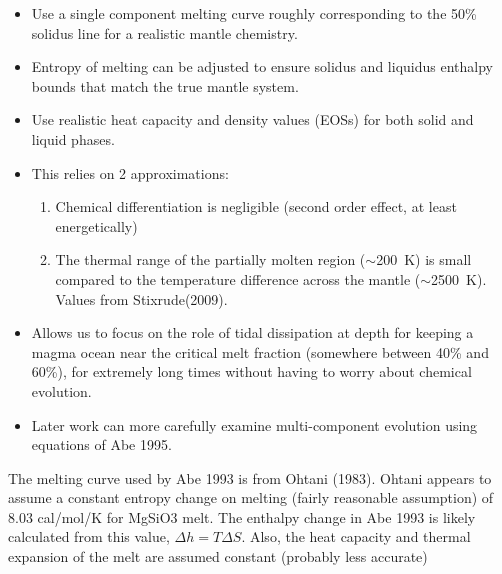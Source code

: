 \begin{itemize}
  \item Use a single component melting curve roughly corresponding to the 50\% solidus line for a realistic mantle chemistry. 
  \item Entropy of melting can be adjusted to ensure solidus and liquidus enthalpy bounds that match the true mantle system. 
  \item Use realistic heat capacity and density values (EOSs) for both solid and liquid phases. 
  \item This relies on 2 approximations: 
    \begin{enumerate}
      \item Chemical differentiation is negligible (second order effect, at least energetically)
      \item The thermal range of the partially molten region ($\sim$200~K) is small compared to the temperature difference across the mantle ($\sim$2500~K). Values from Stixrude(2009).
    \end{enumerate}
  \item Allows us to focus on the role of tidal dissipation at depth for keeping a magma ocean near the critical melt fraction (somewhere between 40\% and 60\%), for extremely long times without having to worry about chemical evolution. 
  \item Later work can more carefully examine multi-component evolution using equations of Abe 1995.
\end{itemize}

The melting curve used by Abe 1993 is from Ohtani (1983). 
Ohtani appears to assume a constant entropy change on melting (fairly reasonable assumption) of 8.03 cal/mol/K for MgSiO3 melt.
The enthalpy change in Abe 1993 is likely calculated from this value, $\Delta h = T \Delta S$.
Also, the heat capacity and thermal expansion of the melt are assumed constant (probably less accurate)

